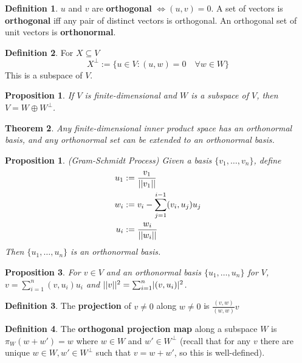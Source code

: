 \documentclass[12pt]{article}
\newtheorem{thm}{Theorem}[section]
\newtheorem{prop}[thm]{Proposition}
\newtheorem*{prop*}{Proposition}
\theoremstyle{definition}
\newtheorem*{defn*}{Definition}
\DeclarePairedDelimiter\length{\lvert\lvert}{\rvert\rvert}
\begin{document}
\begin{defn*}
	$u$ and $v$ are \textbf{orthogonal} $\iff (u, v) = 0$.
	A set of vectors is \textbf{orthogonal} iff any pair of distinct vectors is orthogonal.
	An orthogonal set of unit vectors is \textbf{orthonormal}.
\end{defn*}

\begin{defn*}
	For $X \subseteq V$
	$$X^{\bot} := \{u \in V : (u, w) = 0\quad \forall w \in W\}$$
	This is a subspace of $V$.
\end{defn*}

\begin{prop}
	If $V$ is finite-dimensional and $W$ is a subspace of $V$, then $V = W \oplus W^{\bot}$.
\end{prop}

\begin{thm}
	Any finite-dimensional inner product space has an orthonormal basis, and any orthonormal set can be extended to an orthonormal basis.
\end{thm}

\begin{prop*}
	(Gram-Schmidt Process)
	Given a basis $\{v_1, \ldots, v_n\}$, define
	\begin{align*}
		u_1 &:= \frac{v_1}{\length{v_1}}\\
		w_i &:= v_i - \sum_{j = 1}^{i - 1}(v_i, u_j)u_j\\
		u_i &:= \frac{w_i}{\length{w_i}}
	\end{align*}
	Then $\{u_1, \ldots, u_n\}$ is an orthonormal basis.
\end{prop*}

\begin{prop}
	For $v \in V$ and an orthonormal basis $\{u_1, \ldots, u_n\}$ for $V$, $v = \sum_{i = 1}^n(v, u_i)u_i$ and $\length{v}^2 = \sum_{i = 1}^n\lvert (v, u_i) \rvert^2$.
\end{prop}

\begin{defn*}
	The \textbf{projection} of $v \neq 0$ along $w \neq 0$ is $\frac{(v, w)}{(w, w)}v$
\end{defn*}

\begin{defn*}
	The \textbf{orthogonal projection map} along a subspace $W$ is $\pi_W(w + w') = w$ where $w \in W$ and $w' \in W^{\bot}$ (recall that for any $v$ there are unique $w \in W, w' \in W^{\bot}$ such that $v = w + w'$, so this is well-defined).
\end{defn*}
\end{document}
